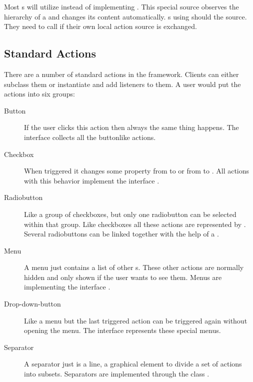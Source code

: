 Most s will utilize  instead of implementing . This special source observes the hierarchy of a  and changes its content automatically. s using  should  the source. They need to call  if their own local action source is exchanged. 


\subsection{Standard Actions}
There are a number of standard actions in the framework. Clients can either subclass them or instantiate and add listeners to them. A user would put the actions into six groups:
\begin{description}
 \item[Button] If the user clicks this action then always the same thing happens. The interface  collects all the buttonlike actions.
 \item[Checkbox] When triggered it changes some property from  to  or from  to . All actions with this behavior implement the interface .
 \item[Radiobutton] Like a group of checkboxes, but only one radiobutton can be selected within that group. Like checkboxes all these actions are represented by . Several radiobuttons can be linked together with the help of a .
 \item[Menu] A menu just contains a list of other s. These other actions are normally hidden and only shown if the user wants to see them. Menus are implementing the interface .
 \item[Drop-down-button] Like a menu but the last triggered action can be triggered again without opening the menu. The interface  represents these special menus.
 \item[Separator] A separator just is a line, a graphical element to divide a set of actions into subsets. Separators are implemented through the class .
\end{description}

